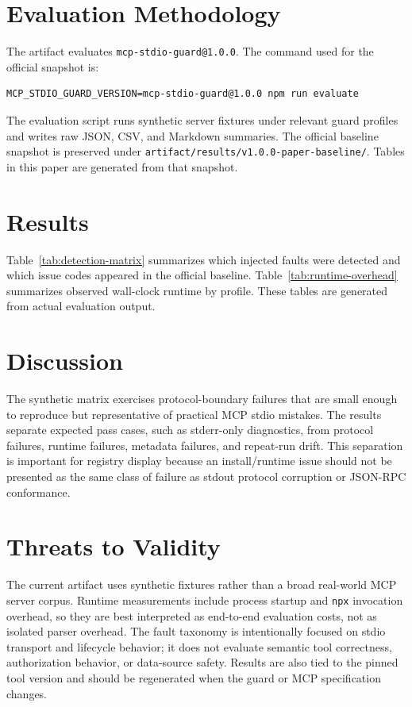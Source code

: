 \documentclass[10pt]{article}
\begin{document}
\section{Evaluation Methodology}

The artifact evaluates \texttt{mcp-stdio-guard@1.0.0}. The command used for the
official snapshot is:

\begin{verbatim}
MCP_STDIO_GUARD_VERSION=mcp-stdio-guard@1.0.0 npm run evaluate
\end{verbatim}

The evaluation script runs synthetic server fixtures under relevant guard
profiles and writes raw JSON, CSV, and Markdown summaries. The official baseline
snapshot is preserved under
\texttt{artifact/results/v1.0.0-paper-baseline/}. Tables in this paper are
generated from that snapshot.

\section{Results}

Table~\ref{tab:detection-matrix} summarizes which injected faults were detected
and which issue codes appeared in the official baseline. Table~\ref{tab:runtime-overhead}
summarizes observed wall-clock runtime by profile. These tables are generated
from actual evaluation output.





\section{Discussion}

The synthetic matrix exercises protocol-boundary failures that are small enough
to reproduce but representative of practical MCP stdio mistakes. The results
separate expected pass cases, such as stderr-only diagnostics, from protocol
failures, runtime failures, metadata failures, and repeat-run drift. This
separation is important for registry display because an install/runtime issue
should not be presented as the same class of failure as stdout protocol
corruption or JSON-RPC conformance.

\section{Threats to Validity}

The current artifact uses synthetic fixtures rather than a broad real-world MCP
server corpus. Runtime measurements include process startup and \texttt{npx}
invocation overhead, so they are best interpreted as end-to-end evaluation
costs, not as isolated parser overhead. The fault taxonomy is intentionally
focused on stdio transport and lifecycle behavior; it does not evaluate semantic
tool correctness, authorization behavior, or data-source safety. Results are
also tied to the pinned tool version and should be regenerated when the guard or
MCP specification changes.
\end{document}

